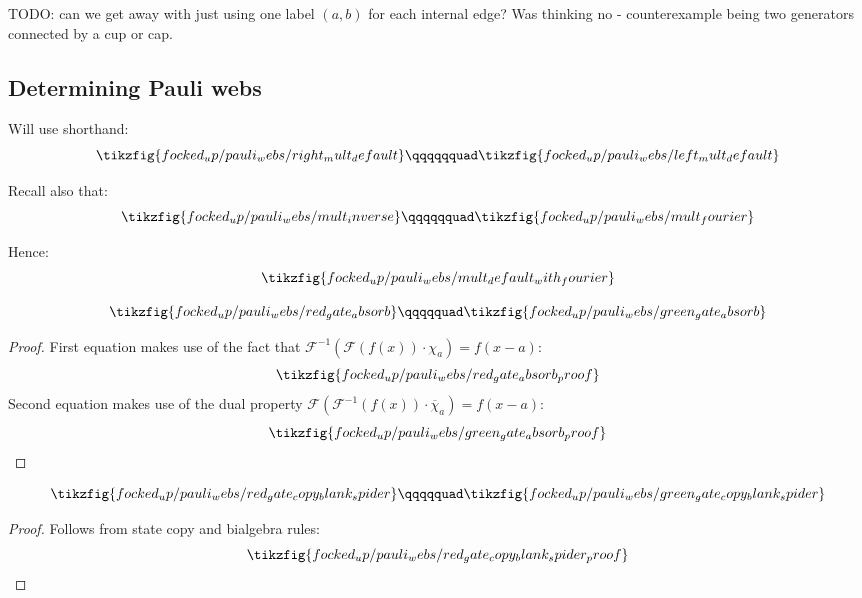 TODO: can we get away with just using one label $(a, b)$ for each internal edge?
Was thinking no - counterexample being two generators connected by a cup or cap.

\subsection{Determining Pauli webs}\label{subsec:determining-pauli-webs}

Will use shorthand:
\begin{equation}\label{eq:mult_default}
\tikzfig{focked_up/pauli_webs/right_mult_default}
\qqqqqquad
\tikzfig{focked_up/pauli_webs/left_mult_default}
\end{equation}

Recall also that:
\begin{equation}\label{eq:mult_inverse_mult_fourier}
\tikzfig{focked_up/pauli_webs/mult_inverse}
\qqqqqquad
\tikzfig{focked_up/pauli_webs/mult_fourier}
\end{equation}

Hence:
\begin{equation}\label{eq:mult_default_with_fourier}
\tikzfig{focked_up/pauli_webs/mult_default_with_fourier}
\end{equation}

\begin{lemma}\label{lem:gate_absorb}
\begin{equation}\label{eq:gate_absorb}
\tikzfig{focked_up/pauli_webs/red_gate_absorb}
\qqqqquad
\tikzfig{focked_up/pauli_webs/green_gate_absorb}
\end{equation}
\begin{proof}
    First equation makes use of the fact that $\mathcal{F}^{-1}(\mathcal{F}(f(x)) \cdot \chi_a) = f(x - a)$:
    \begin{equation}\label{eq:red_gate_absorb_proof}
    \tikzfig{focked_up/pauli_webs/red_gate_absorb_proof}
    \end{equation}
    Second equation makes use of the dual property $\mathcal{F}(\mathcal{F}^{-1}(f(x)) \cdot \overline{\chi}_a) = f(x - a)$:
    \begin{equation}\label{eq:green_gate_absorb_proof}
    \tikzfig{focked_up/pauli_webs/green_gate_absorb_proof}
    \end{equation}
\end{proof}
\end{lemma}

\begin{lemma}\label{lem:gate_copy_blank_spider}
\begin{equation}\label{eq:gate_copy_blank_spider}
\tikzfig{focked_up/pauli_webs/red_gate_copy_blank_spider}
\qqqqquad
\tikzfig{focked_up/pauli_webs/green_gate_copy_blank_spider}
\end{equation}
\begin{proof}
    Follows from state copy and bialgebra rules:
    \begin{equation}\label{eq:red_gate_copy_blank_spider_proof}
    \tikzfig{focked_up/pauli_webs/red_gate_copy_blank_spider_proof}
    \end{equation}
\end{proof}
\end{lemma}

